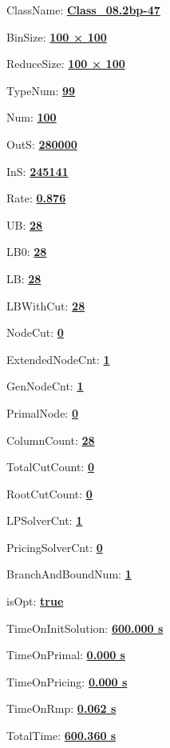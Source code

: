 \documentclass[11pt]{article}
\begin{document}
\pagestyle{empty}


ClassName: \underline{\textbf{Class_08.2bp-47}}
\par
BinSize: \underline{\textbf{100 × 100}}
\par
ReduceSize: \underline{\textbf{100 × 100}}
\par
TypeNum: \underline{\textbf{99}}
\par
Num: \underline{\textbf{100}}
\par
OutS: \underline{\textbf{280000}}
\par
InS: \underline{\textbf{245141}}
\par
Rate: \underline{\textbf{0.876}}
\par
UB: \underline{\textbf{28}}
\par
LB0: \underline{\textbf{28}}
\par
LB: \underline{\textbf{28}}
\par
LBWithCut: \underline{\textbf{28}}
\par
NodeCut: \underline{\textbf{0}}
\par
ExtendedNodeCnt: \underline{\textbf{1}}
\par
GenNodeCnt: \underline{\textbf{1}}
\par
PrimalNode: \underline{\textbf{0}}
\par
ColumnCount: \underline{\textbf{28}}
\par
TotalCutCount: \underline{\textbf{0}}
\par
RootCutCount: \underline{\textbf{0}}
\par
LPSolverCnt: \underline{\textbf{1}}
\par
PricingSolverCnt: \underline{\textbf{0}}
\par
BranchAndBoundNum: \underline{\textbf{1}}
\par
isOpt: \underline{\textbf{true}}
\par
TimeOnInitSolution: \underline{\textbf{600.000 s}}
\par
TimeOnPrimal: \underline{\textbf{0.000 s}}
\par
TimeOnPricing: \underline{\textbf{0.000 s}}
\par
TimeOnRmp: \underline{\textbf{0.062 s}}
\par
TotalTime: \underline{\textbf{600.360 s}}
\par
\newpage


\end{document}
